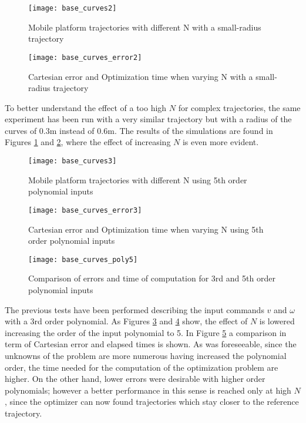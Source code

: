\begin{figure}[!h]
	\centering
	\texttt{[image: base\_curves2]}
	\caption{Mobile platform trajectories with different N with a small-radius trajectory}
	\label{base_curves2}
\end{figure}
\begin{figure}[!h]
	\texttt{[image: base\_curves\_error2]}
	\centering
	\caption{Cartesian error and Optimization time when varying N with a small-radius trajectory}
	\label{base_curves_errors2}
\end{figure}
To better understand the effect of a too high $N$ for complex trajectories, the same experiment has been run with a very similar trajectory but with a radius of the curves of $0.3$m instead of $0.6$m. The results of the simulations are found in Figures \ref{base_curves2} and \ref{base_curves_errors2}, where the effect of increasing $N$ is even more evident.
\begin{figure}[h!]
	\centering
	\texttt{[image: base\_curves3]}
	\caption{Mobile platform trajectories with different N using 5th order polynomial inputs}
	\label{base_curves3}
\end{figure}
\begin{figure}[h!]
	\texttt{[image: base\_curves\_error3]}
	\centering
	\caption{Cartesian error and Optimization time when varying N using 5th order polynomial inputs}
	\label{base_curves_errors3}
\end{figure}
\begin{figure}[h!]
	\centering
	\texttt{[image: base\_curves\_poly5]}
	\caption{Comparison of errors and time of computation for 3rd and 5th order polynomial inputs}
	\label{base_curves_poly5}
\end{figure}
The previous tests have been performed describing the input commands $v$ and $\omega$ with a 3rd order polynomial. As Figures \ref{base_curves3} and \ref{base_curves_errors3} show, the effect of $N$ is lowered increasing the order of the input polynomial to 5. In Figure \ref{base_curves_poly5} a comparison in term of Cartesian error and elapsed times is shown. As was foreseeable, since the unknowns of the problem are more numerous having increased the polynomial order, the time needed for the computation of the optimization problem are higher. On the other hand, lower errors were desirable with higher order polynomials; however a better performance in this sense is reached only at high $N$, since the optimizer can now found trajectories which stay closer to the reference trajectory.
